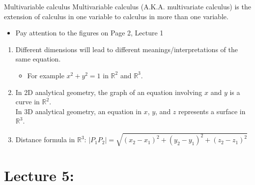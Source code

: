 \documentclass{beamer}
\begin{document}
\begin{frame}[allowframebreaks]{Multivariable calculus}
	Multivariable calculus (A.K.A. multivariate calculus) is the extension of calculus
	in one variable to calculus in more than one variable.
\begin{itemize}
	\item Pay attention to the figures on Page 2, Lecture 1
\end{itemize}
\begin{enumerate}
	\item Different \alert{dimensions} will lead to different meanings/interpretations of the \alert{same} equation.
	\begin{itemize}
		\item For example $x^2 + y^2 = 1$ in $\mathbb{R}^2$ and $\mathbb{R}^3$.
	\end{itemize}
	
	\item In 2D analytical geometry, the graph of an equation involving $x$ and $y$ is a \alert{curve} in $\mathbb{R}^2$. \\In 3D analytical geometry, an equation in $x$, $y$, and $z$ represents a \alert{surface} in $\mathbb{R}^3$.
	
	\item Distance formula in $\mathbb{R}^3$: $|P_1P_2| = \sqrt{(x_2 - x_1)^2 + (y_2 - y_1)^2 + (z_2-z_1)^2}$
\end{enumerate}


\end{frame}









\section{Lecture 5:}
\end{document}
